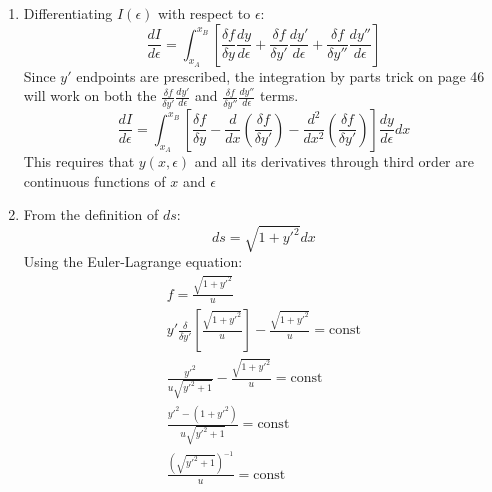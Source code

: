 \documentclass[12pt]{article}
\begin{document}
\begin{enumerate}
\begin{enumerate}
        \end{enumerate}
        \item
        Differentiating $I(\epsilon)$ with respect to $\epsilon$:
        \[
            \frac{dI}{d\epsilon}=\int_{x_A}^{x_B}\left[\frac{\delta f}{\delta y}\frac{dy}{d\epsilon}+\frac{\delta f}{\delta y'}\frac{dy'}{d\epsilon}+\frac{\delta f}{\delta y''}\frac{dy''}{d\epsilon}\right]
        \]
        Since $y'$ endpoints are prescribed, the integration by parts trick on page 46 will work on both the $\frac{\delta f}{\delta y'}\frac{dy'}{d\epsilon}$ and $\frac{\delta f}{\delta y''}\frac{dy''}{d\epsilon}$ terms.
        \[
            \frac{dI}{d\epsilon}=\int_{x_A}^{x_B}\left[\frac{\delta f}{\delta y}-\frac{d}{dx}\left(\frac{\delta f}{\delta y'}\right)-\frac{d^2}{dx^2}\left(\frac{\delta f}{\delta y'}\right)\right]\frac{dy}{d\epsilon}dx
        \]
        This requires that $y(x,\epsilon)$ and all its derivatives through third order are continuous functions of $x$ and $\epsilon$
        \item
        From the definition of $ds$:
        \[
            ds=\sqrt{1+y'^2}dx
        \]
        Using the Euler-Lagrange equation:
        \begin{gather*}
            f=\frac{\sqrt{1+y'^2}}{u}\\
            y'\frac{\delta}{\delta y'}\left[\frac{\sqrt{1+y'^2}}{u}\right]-\frac{\sqrt{1+y'^2}}{u}=\text{const}\\
            \frac{y'^2}{u\sqrt{y'^2+1}}-\frac{\sqrt{1+y'^2}}{u}=\text{const}\\
            \frac{y'^2-\left(1+y'^2\right)}{u\sqrt{y'^2+1}}=\text{const}\\
            \frac{\left(\sqrt{y'^2+1}\right)^{-1}}{u}=\text{const}\\
        \end{gather*}
    \end{enumerate}
\end{document}

